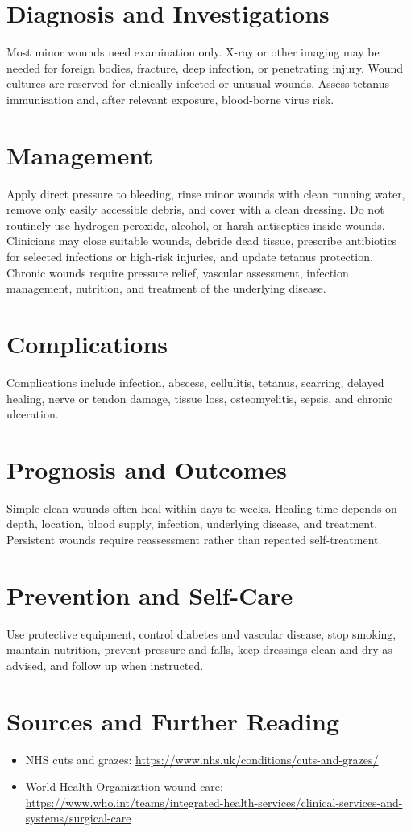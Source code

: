 \section*{Diagnosis and Investigations}
Most minor wounds need examination only. X-ray or other imaging may be needed for foreign bodies, fracture, deep infection, or penetrating injury. Wound cultures are reserved for clinically infected or unusual wounds. Assess tetanus immunisation and, after relevant exposure, blood-borne virus risk.
\section*{Management}
Apply direct pressure to bleeding, rinse minor wounds with clean running water, remove only easily accessible debris, and cover with a clean dressing. Do not routinely use hydrogen peroxide, alcohol, or harsh antiseptics inside wounds. Clinicians may close suitable wounds, debride dead tissue, prescribe antibiotics for selected infections or high-risk injuries, and update tetanus protection. Chronic wounds require pressure relief, vascular assessment, infection management, nutrition, and treatment of the underlying disease.
\section*{Complications}
Complications include infection, abscess, cellulitis, tetanus, scarring, delayed healing, nerve or tendon damage, tissue loss, osteomyelitis, sepsis, and chronic ulceration.
\section*{Prognosis and Outcomes}
Simple clean wounds often heal within days to weeks. Healing time depends on depth, location, blood supply, infection, underlying disease, and treatment. Persistent wounds require reassessment rather than repeated self-treatment.
\section*{Prevention and Self-Care}
Use protective equipment, control diabetes and vascular disease, stop smoking, maintain nutrition, prevent pressure and falls, keep dressings clean and dry as advised, and follow up when instructed.
\section*{Sources and Further Reading}
\begin{itemize}
    \item NHS cuts and grazes: \url{https://www.nhs.uk/conditions/cuts-and-grazes/}
    \item World Health Organization wound care: \url{https://www.who.int/teams/integrated-health-services/clinical-services-and-systems/surgical-care}
\end{itemize}

